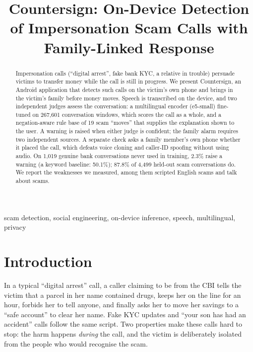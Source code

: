 \documentclass[conference,a4paper]{IEEEtran}
\begin{document}
\title{Countersign: On-Device Detection of Impersonation Scam Calls with Family-Linked Response}

\author{
}

\maketitle

\begin{abstract}
Impersonation calls (``digital arrest'', fake bank KYC, a relative in trouble) persuade victims to transfer money
while the call is still in progress. We present Countersign, an Android application that detects such calls on the
victim's own phone and brings in the victim's family before money moves. Speech is transcribed on the device, and
two independent judges assess the conversation: a multilingual encoder (e5-small) fine-tuned on 267{,}601
conversation windows, which scores the call as a whole, and a negation-aware rule base of 19 scam ``moves'' that
supplies the explanation shown to the user. A warning is raised when either judge is confident; the family alarm
requires two independent sources. A separate check asks a family member's own phone whether it placed the call,
which defeats voice cloning and caller-ID spoofing without using audio. On 1{,}019 genuine bank conversations never
used in training, 2.3\% raise a warning (a keyword baseline: 50.1\%); 87.8\% of 4{,}499 held-out scam conversations
do. We report the weaknesses we measured, among them scripted English scams and talk about scams.
\end{abstract}

\begin{IEEEkeywords}
scam detection, social engineering, on-device inference, speech, multilingual, privacy
\end{IEEEkeywords}

\section{Introduction}

In a typical ``digital arrest'' call, a caller claiming to be from the CBI tells the victim that a parcel in her
name contained drugs, keeps her on the line for an hour, forbids her to tell anyone, and finally asks her to move her
savings to a ``safe account'' to clear her name. Fake KYC updates and ``your son has had an accident'' calls follow
the same script. Two properties make these calls hard to stop: the harm happens \emph{during} the call, and the
victim is deliberately isolated from the people who would recognise the scam.
\end{document}
